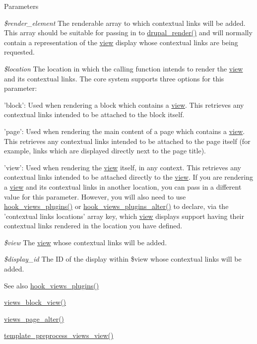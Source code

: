 \begin{DoxyParams}{Parameters}
\item[{\em \$render\_\-element}]The renderable array to which contextual links will be added. This array should be suitable for passing in to \hyperlink{common_8inc_a05798b44e8d6c496d4bee5cc32fa7851}{drupal\_\-render()} and will normally contain a representation of the \hyperlink{classview}{view} display whose contextual links are being requested. \item[{\em \$location}]The location in which the calling function intends to render the \hyperlink{classview}{view} and its contextual links. The core system supports three options for this parameter:
\begin{DoxyItemize}
\item 'block': Used when rendering a block which contains a \hyperlink{classview}{view}. This retrieves any contextual links intended to be attached to the block itself.
\item 'page': Used when rendering the main content of a page which contains a \hyperlink{classview}{view}. This retrieves any contextual links intended to be attached to the page itself (for example, links which are displayed directly next to the page title).
\item 'view': Used when rendering the \hyperlink{classview}{view} itself, in any context. This retrieves any contextual links intended to be attached directly to the \hyperlink{classview}{view}. If you are rendering a \hyperlink{classview}{view} and its contextual links in another location, you can pass in a different value for this parameter. However, you will also need to use \hyperlink{group__views__hooks_ga23f6e9972b2ed84fc54b7ff63f44477d}{hook\_\-views\_\-plugins()} or \hyperlink{group__views__hooks_ga6c4e4c2a769b0017bf0edcd0adae57e9}{hook\_\-views\_\-plugins\_\-alter()} to declare, via the 'contextual links locations' array key, which \hyperlink{classview}{view} displays support having their contextual links rendered in the location you have defined. 
\end{DoxyItemize}\item[{\em \$view}]The \hyperlink{classview}{view} whose contextual links will be added. \item[{\em \$display\_\-id}]The ID of the display within \$view whose contextual links will be added.\end{DoxyParams}
\begin{DoxySeeAlso}{See also}
\hyperlink{group__views__hooks_ga23f6e9972b2ed84fc54b7ff63f44477d}{hook\_\-views\_\-plugins()} 

\hyperlink{views_8module_ae2b10c93b6c54fb61100759aed3b7299}{views\_\-block\_\-view()} 

\hyperlink{views_8module_a278afcd00ca124837da7016ede4e64b2}{views\_\-page\_\-alter()} 

\hyperlink{profiles_2dosomething_2modules_2contrib_2views_2theme_2theme_8inc_a9390b0a0ab9315839031fadfc73df433}{template\_\-preprocess\_\-views\_\-view()} 
\end{DoxySeeAlso}
